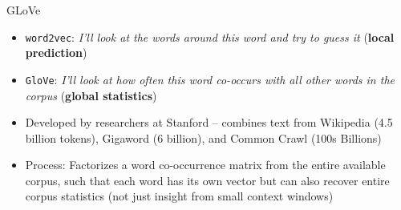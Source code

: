 \documentclass[
  ignorenonframetext,
  aspectratio=169]{beamer}
\begin{document}
\begin{frame}{GLoVe}
\label{glove}
\begin{itemize}
\item \texttt{word2vec}: \emph{I’ll look at the words around this word and try to guess it} (\textbf{local prediction}) \par \vspace{2.5mm} \pause
\item \texttt{GloVe}: \emph{I’ll look at how often this word co-occurs with all other words in the corpus} (\textbf{global statistics}) \par \vspace{2.5mm} \pause
\item Developed by researchers at Stanford -- combines text from Wikipedia (4.5 billion tokens), Gigaword (6 billion), and Common Crawl (100s Billions) \par \vspace{2.5mm} \pause
\item Process: Factorizes a word co-occurrence matrix from the entire available corpus, such that each word has its own vector but can also recover entire corpus statistics (not just insight from small context windows)
\end{itemize}
\end{frame}
\end{document}
